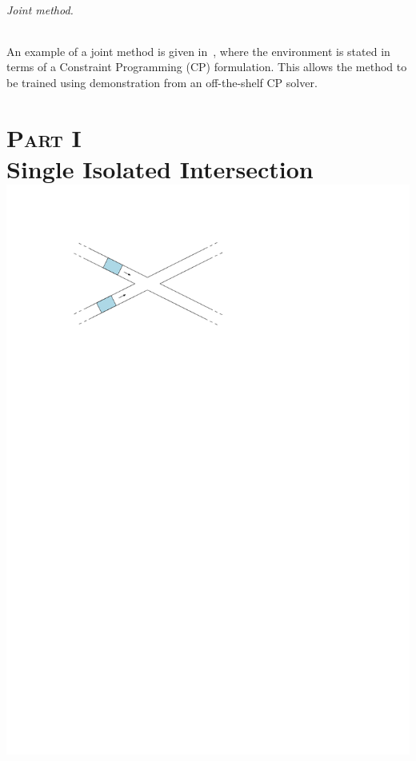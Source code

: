 \documentclass[a4paper]{report}
\theoremstyle{definition}
\theoremstyle{plain}
\begin{document}
\paragraph{Joint method.}
An example of a joint method is given
in~\cite{tasselEndEndReinforcementLearning2023}, where the environment is stated
in terms of a Constraint Programming (CP) formulation. This allows the method to
be trained using demonstration from an off-the-shelf CP solver.


\part*{\hspace*{-0.8em}\textsc{Part I}\\[0.6em] Single Isolated Intersection\\[3em]
       \centering\includegraphics[scale=1]{figures/intersection-non-axis-aligned}}
\end{document}
